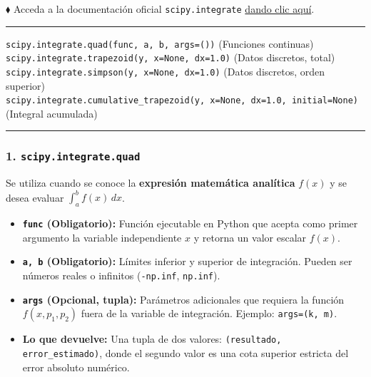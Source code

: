 \documentclass[12pt]{article}
\begin{document}
\begin{cajaflex}

$\blacklozenge$ Acceda a la documentación oficial \lstinline|scipy.integrate| 
\href{https://docs.scipy.org/doc/scipy/reference/integrate.html}{dando clic aquí}.

\textcolor{teal!60!black}{\rule{\linewidth}{0.8pt}}

\lstinline|scipy.integrate.quad(func, a, b, args=())| \quad \textsf{\small(Funciones continuas)} \\
\lstinline|scipy.integrate.trapezoid(y, x=None, dx=1.0)| \quad \textsf{\small(Datos discretos, total)} \\
\lstinline|scipy.integrate.simpson(y, x=None, dx=1.0)| \quad \textsf{\small(Datos discretos, orden superior)} \\
\lstinline|scipy.integrate.cumulative_trapezoid(y, x=None, dx=1.0, initial=None)| \quad \textsf{\small(Integral acumulada)}

\textcolor{teal!60!black}{\rule{\linewidth}{0.8pt}}

\vspace{0.1cm}

\subsubsection*{\textcolor{teal!70!black}{1. \texttt{scipy.integrate.quad} }}
Se utiliza cuando se conoce la \textbf{expresión matemática analítica} $f(x)$ y se desea evaluar $\int_a^b f(x)\,dx$.
\begin{itemize}
    \item \textbf{\texttt{func} (Obligatorio):} Función ejecutable en Python que acepta como primer argumento la variable independiente $x$ y retorna un valor escalar $f(x)$.
    \item \textbf{\texttt{a, b} (Obligatorio):} Límites inferior y superior de integración. Pueden ser números reales o infinitos (\texttt{-np.inf}, \texttt{np.inf}).
    \item \textbf{\texttt{args} (Opcional, tupla):} Parámetros adicionales que requiera la función $f(x, p_1, p_2)$ fuera de la variable de integración. Ejemplo: \texttt{args=(k, m)}.
    \item \textbf{Lo que devuelve:} Una tupla de dos valores: \texttt{(resultado, error\_estimado)}, donde el segundo valor es una cota superior estricta del error absoluto numérico.
\end{itemize}


\end{cajaflex}
\end{document}
